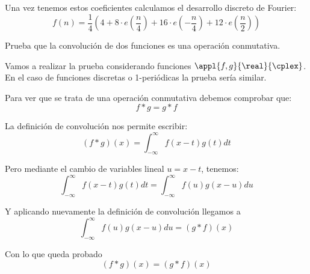 \begin{problem}[1]
Una vez tenemos estos coeficientes calculamos el desarrollo discreto de Fourier:
\[f(n) = \frac{1}{4}\left( 4 + 8 \cdot e \left(\frac{n}{4}\right)+16\cdot e \left(-\frac{n}{4}\right)+12\cdot e \left(\frac{n}{2}\right)\right)\]
\end{problem}

\begin{problem}[2]
	Prueba que la convolución de dos funciones es una operación conmutativa.
	\solution

	Vamos a realizar la prueba considerando funciones $\appl{f,g}{\real}{\cplex}$. En el caso de funciones discretas o 1-periódicas la prueba sería similar.

	Para ver que se trata de una operación conmutativa debemos comprobar que:
	$$f * g = g * f$$

	La definición de convolución nos permite escribir:
	\[(f * g) (x) = \int_{-\infty}^{\infty} f(x - t) g(t) dt \]

	Pero mediante el cambio de variables lineal $u = x - t$, tenemos:
	\[\int_{-\infty}^{\infty} f(x - t) g(t) dt =\int^{\infty}_{-\infty} f(u) g(x - u) du \]

	Y aplicando nuevamente la definición de convolución llegamos a
	\[\int^{\infty}_{-\infty} f(u) g(x - u) du = (g * f)(x) \]

	Con lo que queda probado
	\[(f * g) (x)  = (g * f) (x) \]


\end{problem}

